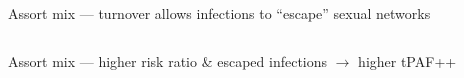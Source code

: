 \documentclass[aspectratio=169]{beamer}
\begin{document}
\begin{frame}{Assort mix --- turnover allows infections to ``escape'' sexual networks}
  \assotrue
  \begin{columns}
    \begin{column}{0.6\linewidth}%
    \end{column}
    \begin{column}{0.2\linewidth}
      \centering{}
    \end{column}
    \begin{column}{0.2\linewidth}
      \centering{}
    \end{column}
  \end{columns}
\end{frame}
\begin{frame}{Assort mix --- higher risk ratio \& escaped infections $\rightarrow$ higher tPAF++}
  \assotrue
  \begin{columns}
    \begin{column}{0.6\linewidth}%
      \centering\visible<+->{}
      \xpar
      \begin{itemize}
      \end{itemize}
    \end{column}
    \begin{column}{0.2\linewidth}
      \centering{}
    \end{column}
    \begin{column}{0.2\linewidth}
      \centering{}
    \end{column}
  \end{columns}
\end{frame}
\end{document}
